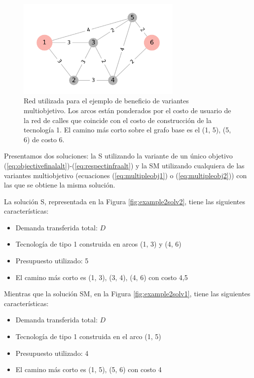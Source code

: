 \begin{figure}[h!]
  \centering
  \includegraphics[width=8cm]{../resources/example_2_base.png}
  \caption{Red utilizada para el ejemplo de beneficio de variantes multiobjetivo. Los arcos están ponderados por el costo de usuario de la red de calles que coincide con el costo de construcción de la tecnología 1. El camino más corto sobre el grafo base es el (1, 5), (5, 6) de costo 6.}
  \label{fig:example2base}
\end{figure}

\FloatBarrier

Presentamos dos soluciones: la S utilizando la variante de un único objetivo (\ref{eq:objectivefinalalt})-(\ref{eq:respectinfraalt}) y la SM utilizando cualquiera de las variantes multiobjetivo (ecuaciones (\ref{eq:multipleobj1}) o (\ref{eq:multipleobj2})) con las que se obtiene la misma solución.

La solución S, representada en la Figura \ref{fig:example2solv2}, tiene las siguientes características:

\begin{itemize}
  \item{Demanda transferida total: $D$}
  \item{Tecnología de tipo 1 construida en arcos (1, 3) y (4, 6)}
  \item{Presupuesto utilizado: 5}
  \item{El camino más corto es (1, 3), (3, 4), (4, 6) con costo 4,5}
\end{itemize}

Mientras que la solución SM, en la Figura \ref{fig:example2solv1}, tiene las siguientes características:

\begin{itemize}
  \item{Demanda transferida total: $D$}
  \item{Tecnología de tipo 1 construida en el arco (1, 5)}
  \item{Presupuesto utilizado: 4}
  \item{El camino más corto es (1, 5), (5, 6) con costo 4}
\end{itemize}

